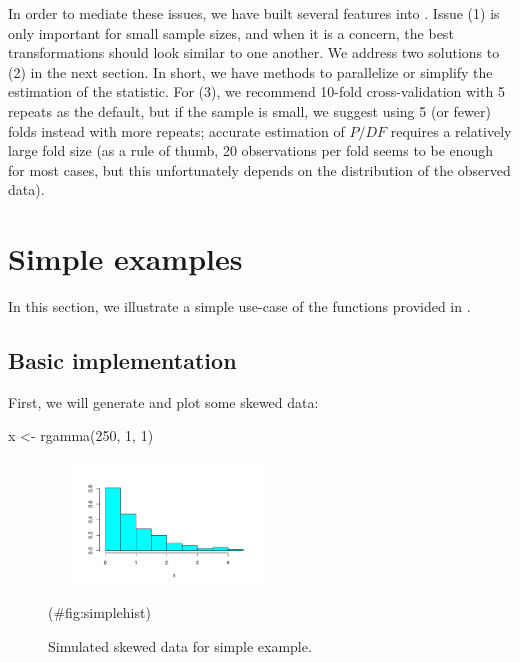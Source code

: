 In order to mediate these issues, we have built several features into
. Issue (1) is only important for small sample sizes,
and when it is a concern, the best transformations should look similar
to one another. We address two solutions to (2) in the next section. In
short, we have methods to parallelize or simplify the estimation of the
statistic. For (3), we recommend 10-fold cross-validation with 5 repeats
as the default, but if the sample is small, we suggest using 5 (or
fewer) folds instead with more repeats; accurate estimation of \(P/DF\)
requires a relatively large fold size (as a rule of thumb, 20
observations per fold seems to be enough for most cases, but this
unfortunately depends on the distribution of the observed data).

\hypertarget{simple-examples}{%
\section{Simple examples}\label{simple-examples}}

In this section, we illustrate a simple use-case of the functions
provided in .

\hypertarget{basic-implementation}{%
\subsection{Basic implementation}\label{basic-implementation}}

First, we will generate and plot some skewed data:

\begin{Schunk}
\begin{Sinput}
x <- rgamma(250, 1, 1)
\end{Sinput}
\end{Schunk}

\begin{Schunk}
\begin{figure}

{\centering \includegraphics[width=2.5in,height=1.3in]{figs/simplehist-1} 

}

\caption[Simulated skewed data for simple example]{Simulated skewed data for simple example.}(\#fig:simplehist)
\end{figure}
\end{Schunk}

